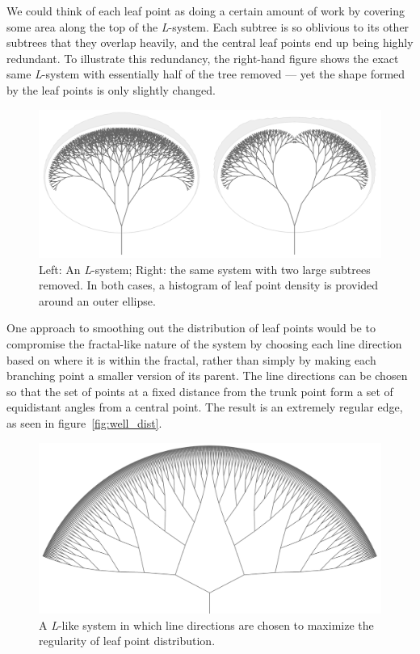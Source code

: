 \documentclass[20pt,]{extarticle}
\begin{document}
We could think of each leaf point as doing a certain amount of work by
covering some area along the top of the \emph{L}-system. Each subtree is
so oblivious to its other subtrees that they overlap heavily, and the
central leaf points end up being highly redundant. To illustrate this
redundancy, the right-hand figure shows the exact same \emph{L}-system
with essentially half of the tree removed --- yet the shape formed by
the leaf points is only slightly changed.

\begin{figure}[htbp]
\centering
\includegraphics{images/ellsystem2.png}
\caption{\label{fig:ellsystem}Left: An \emph{L}-system; Right: the same
system with two large subtrees removed. In both cases, a histogram of
leaf point density is provided around an outer
ellipse.}\label{fig:ellsystem}
\end{figure}

One approach to smoothing out the distribution of leaf points would be
to compromise the fractal-like nature of the system by choosing each
line direction based on where it is within the fractal, rather than
simply by making each branching point a smaller version of its parent.
The line directions can be chosen so that the set of points at a fixed
distance from the trunk point form a set of equidistant angles from a
central point. The result is an extremely regular edge, as seen in
figure~\ref{fig:well_dist}.

\begin{figure}[htbp]
\centering
\includegraphics{images/well_distributed_ell_like_system.png}
\caption{\label{fig:well_dist}A \emph{L}-like system in which line
directions are chosen to maximize the regularity of leaf point
distribution.}\label{fig:wellux5fdist}
\end{figure}
\end{document}
